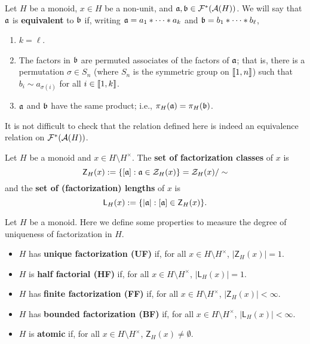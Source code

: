 \begin{defn}
Let $H$ be a monoid, $x\in H$ be a non-unit, and $\aa,\bb \in \F^*(\A(H))$.
We will say that $\aa$ is \textbf{equivalent} to $\bb$ if, writing $\aa = a_1*\cdots * a_k$ and $\bb = b_1*\cdots * b_\ell$,
\begin{enumerate}
\item $k = \ell$.
\item The factors in $\bb$ are permuted associates of the factors of $\aa$; that is, there is a permutation $\sigma\in S_n$ (where $S_n$ is the symmetric group on $\llb 1,n \rrb$) such that $b_i \sim a_{\sigma(i)}$ for all $i\in \llb 1,k \rrb$.
\item $\aa$ and $\bb$ have the same product; i.e., $\pi_H(\aa) = \pi_H(\bb)$.
\end{enumerate}
\end{defn}

It is not difficult to check that the relation defined here is indeed an equivalence relation on $\F^*(\A(H))$.

\begin{defn}
Let $H$ be a monoid and $x\in H\setminus H^\times$.
The \textbf{set of factorization classes} of $x$ is
\[ \mathsf{Z}_H(x) := \{ [\aa]: \aa\in \Z_H(x) \} = \Z_H(x)/\sim \]
and the \textbf{set of (factorization) lengths} of $x$ is
\[ \mathsf{L}_H(x) := \{ |\aa| : [\aa] \in \mathsf{Z}_H(x) \}. \]
\end{defn}

\begin{defn}
Let $H$ be a monoid.
Here we define some properties to measure the degree of uniqueness of factorization in $H$.
\begin{itemize}
\item $H$ has \textbf{unique factorization (UF)} if, for all $x\in H\setminus H^\times$, $|\mathsf{Z}_H(x)| = 1$.
\item $H$ is \textbf{half factorial (HF)} if, for all $x\in H\setminus H^\times$, $|\mathsf{L}_H(x)| = 1$.
\item $H$ has \textbf{finite factorization (FF)} if, for all $x\in H\setminus H^\times$, $|\mathsf{Z}_H(x)| <\infty$.
\item $H$ has \textbf{bounded factorization (BF)} if, for all $x\in H\setminus H^\times$, $|\mathsf{L}_H(x)| < \infty$.
\item $H$ is \textbf{atomic} if, for all $x\in H\setminus H^\times$, $\mathsf{Z}_H(x) \neq \emptyset$.
\end{itemize}
\end{defn}

